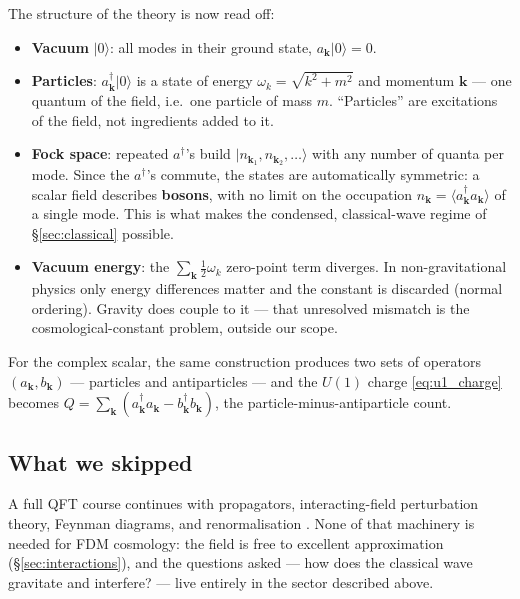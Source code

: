 \documentclass[12pt]{article}
\newcommand{\bk}{\mathbf{k}}
\begin{document}
The structure of the theory is now read off:
%
\begin{itemize}
  \item \textbf{Vacuum} $|0\rangle$: all modes in their ground state,
        $a_\bk|0\rangle = 0$.
  \item \textbf{Particles}: $a^\dagger_\bk|0\rangle$ is a state of
        energy $\omega_k = \sqrt{k^2+m^2}$ and momentum $\bk$ --- one
        quantum of the field, i.e.\ one particle of mass $m$.
        ``Particles'' are excitations of the field, not ingredients
        added to it.
  \item \textbf{Fock space}: repeated $a^\dagger$'s build
        $|n_{\bk_1}, n_{\bk_2}, \dots\rangle$ with any number of
        quanta per mode.  Since the $a^\dagger$'s commute, the states
        are automatically symmetric: a scalar field describes
        \textbf{bosons}, with no limit on the occupation
        $n_\bk = \langle a^\dagger_\bk a_\bk\rangle$ of a single
        mode.  This is what makes the condensed, classical-wave
        regime of \S\ref{sec:classical} possible.
  \item \textbf{Vacuum energy}: the $\sum_\bk \tfrac{1}{2}\omega_k$
        zero-point term diverges.  In non-gravitational physics only
        energy differences matter and the constant is discarded
        (normal ordering).  Gravity does couple to it --- that
        unresolved mismatch is the cosmological-constant problem,
        outside our scope.
\end{itemize}

For the complex scalar, the same construction produces two sets of
operators $(a_\bk, b_\bk)$ --- particles and antiparticles --- and
the $U(1)$ charge \eqref{eq:u1_charge} becomes
$Q = \sum_\bk (a^\dagger_\bk a_\bk - b^\dagger_\bk b_\bk)$, the
particle-minus-antiparticle count.

\subsection{What we skipped}
\label{sec:skipped}

A full QFT course continues with propagators, interacting-field
perturbation theory, Feynman diagrams, and renormalisation
\citep{PeskinSchroeder1995, Srednicki2007}.  None of that machinery
is needed for FDM cosmology: the field is free to excellent
approximation (\S\ref{sec:interactions}), and the questions asked ---
how does the classical wave gravitate and interfere? --- live
entirely in the sector described above.
\end{document}
